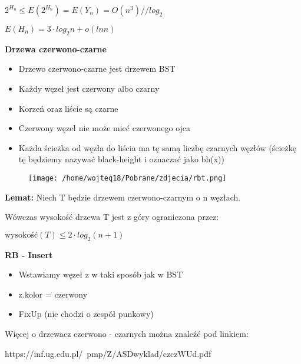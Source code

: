 \documentclass{article}
\begin{document}
    $2^{H_{n}} \leq E(2^{H_{n}}) = E(Y_{n}) = O(n^3) //log_{2}$ \par
    $E(H_{n}) = 3 \cdot log_2{n} + o(lnn)$ \par
    \newpage
    \textbf{Drzewa czerwono-czarne} \par   
    \begin{itemize}
        \item Drzewo czerwono-czarne jest drzewem BST
        \item Każdy węzeł jest czerwony albo czarny
        \item Korzeń oraz liście są czarne
        \item Czerwony węzeł nie może mieć czerwonego ojca
        \item Każda ścieżka od węzła do liścia ma tę samą liczbę czarnych węzłów (ścieżkę tę będziemy nazywać black-height i oznaczać jako bh(x))
    \end{itemize}
    \vspace{1\baselineskip}
    \begin{figure}[H]
        \centering
        \texttt{[image: /home/wojteq18/Pobrane/zdjecia/rbt.png]}
        \label{fig:example_image}
    \end{figure} \par
    \vspace{1\baselineskip}
    \textbf{Lemat: } Niech T będzie drzewem czerwono-czarnym o n węzłach. \par Wówczas wysokość drzewa T jest z góry ograniczona przez: \par
    \begin{center}
        $\text{wysokość}(T) \leq 2 \cdot log_2(n + 1)$
    \end{center}
    \vspace{1\baselineskip}
    \textbf{RB - Insert} \par
    \begin{itemize}
        \item Wstawiamy węzeł z w taki sposób jak w BST
        \item z.kolor = czerwony
        \item FixUp (nie chodzi o zespół punkowy)
    \end{itemize}
    Więcej o drzewacz czerwono - czarnych można znaleźć pod linkiem: \par 
    \begin{center}
        https://inf.ug.edu.pl/~pmp/Z/ASDwyklad/czczWUd.pdf
    \end{center} \par
\end{document}
